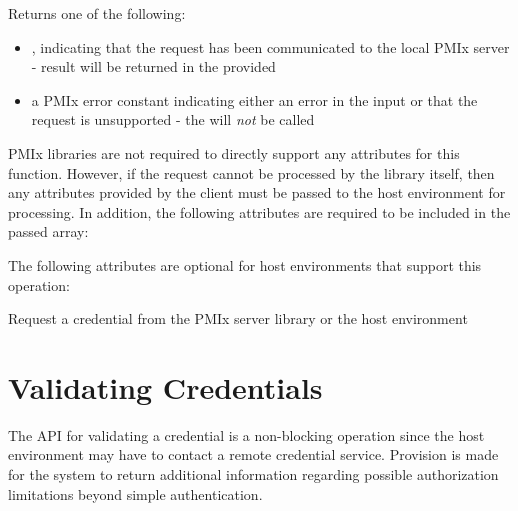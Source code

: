 \begin{arglist}
\end{arglist}

Returns one of the following:

\begin{itemize}
    \item {}, indicating that the request has been communicated to the local \ac{PMIx} server - result will be returned in the provided 
    \item a \ac{PMIx} error constant indicating either an error in the input or that the request is unsupported - the  will \textit{not} be called
\end{itemize}

\reqattrstart
\ac{PMIx} libraries are not required to directly support any attributes for this function. However, if the request cannot be processed by the library itself, then any attributes provided by the client must be passed to the host environment for processing. In addition, the following attributes are required to be included in the passed  array:


\reqattrend

\optattrstart
The following attributes are optional for host environments that support this operation:


\optattrend

\descr

Request a credential from the \ac{PMIx} server library or the host environment

\section{Validating Credentials}
\label{chap:api_security:validate}

The \ac{API} for validating a credential is a non-blocking operation since the host environment may have to contact a remote credential service. Provision is made for the system to return additional information regarding possible authorization limitations beyond simple authentication.

